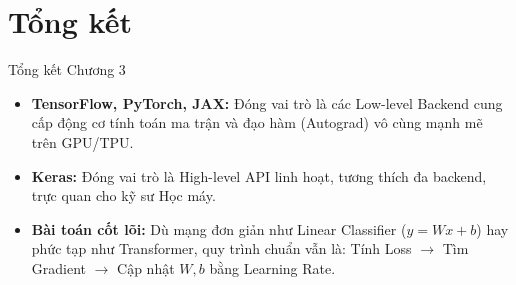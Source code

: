 \documentclass[aspectratio=169]{beamer}
\begin{document}
\section{Tổng kết}

\begin{frame}{Tổng kết Chương 3}
    \begin{itemize}
        \item \textbf{TensorFlow, PyTorch, JAX:} Đóng vai trò là các Low-level Backend cung cấp động cơ tính toán ma trận và đạo hàm (Autograd) vô cùng mạnh mẽ trên GPU/TPU.
        \item \textbf{Keras:} Đóng vai trò là High-level API linh hoạt, tương thích đa backend, trực quan cho kỹ sư Học máy.
        \item \textbf{Bài toán cốt lõi:} Dù mạng đơn giản như Linear Classifier ($y=Wx+b$) hay phức tạp như Transformer, quy trình chuẩn vẫn là: Tính Loss $\rightarrow$ Tìm Gradient $\rightarrow$ Cập nhật $W, b$ bằng Learning Rate.
    \end{itemize}
\end{frame}
\end{document}
